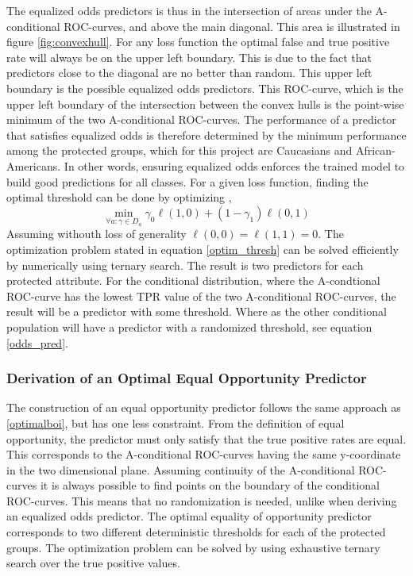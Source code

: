 \documentclass[11pt, fleqn, titlepage]{article}
\begin{document}
	The equalized odds predictors is thus in the intersection of areas under the A-conditional ROC-curves, and above the main diagonal. This area is illustrated in figure \ref{fig:convexhull}. For any loss function the optimal false and true positive rate will always be on the upper left boundary. This is due to the fact that predictors close to the diagonal are no better than random. This upper left boundary is the possible equalized odds predictors. This ROC-curve, which is the upper left boundary of the intersection between the convex hulls is the point-wise minimum of the two A-conditional ROC-curves. The performance of a predictor that satisfies equalized odds is therefore determined by the minimum performance among the protected groups, which for this project are Caucasians and African-Americans. In other words, ensuring equalized odds enforces the trained model to build good predictions for all classes. For a given loss function, finding the optimal threshold can be done by optimizing ,
	\begin{equation}\label{optim_thresh}
	\min _{\forall a: \gamma \in D_{a}} \gamma_{0} \ell(1,0)+\left(1-\gamma_{1}\right) \ell(0,1)
	\end{equation}
	Assuming withouth loss of generality $ \ell (0,0) = \ell(1,1)=0 $.
	The optimization problem stated in equation \ref{optim_thresh} can be solved efficiently by numerically using ternary search. The result is two predictors for each protected attribute. For the conditional distribution, where the A-condtional ROC-curve has the lowest TPR value of the two A-conditional ROC-curves, the result will be a predictor with some threshold. Where as the other conditional population will have a predictor with a randomized threshold, see equation \ref{odds_pred}. \cite{equal_of_oppor}
	\subsubsection{Derivation of an Optimal Equal Opportunity Predictor}\label{optimalboi equal_oppor}
	
	The construction of an equal opportunity predictor follows the same approach as \ref{optimalboi}, but has one less constraint. From the definition of equal opportunity, the predictor must only satisfy that the true positive rates are equal. This corresponds to the A-conditional ROC-curves having the same y-coordinate in the two dimensional plane. Assuming continuity of the A-conditional ROC-curves it is always possible to find points on the boundary of the conditional ROC-curves. This means that no randomization is needed, unlike when deriving an equalized odds predictor. The optimal equality of opportunity predictor corresponds to two different deterministic thresholds for each of the protected groups. The optimization problem can be solved by using exhaustive ternary search over the true positive values. \cite{equal_of_oppor} %
	
\end{document}
